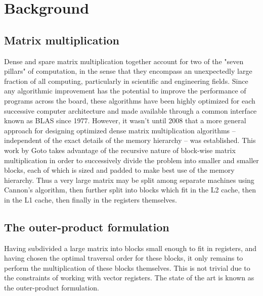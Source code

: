 \chapter{Background}
\label{chapter:review}

\section{Matrix multiplication}
Dense and spare matrix multiplication together account for two of the "seven pillars" of computation, in the sense that they encompass an unexpectedly large fraction of all computing, particularly in scientific and engineering fields. Since any algorithmic improvement has the potential to improve the performance of programs across the board, these algorithms have been highly optimized for each successive computer architecture and made available through a common interface known as BLAS since 1977. However, it wasn't until 2008 that a more general approach for designing optimized dense matrix multiplication algorithms -- independent of the exact details of the memory hierarchy -- was established. This work by Goto takes advantage of the recursive nature of block-wise matrix multiplication in order to successively divide the problem into smaller and smaller blocks, each of which is sized and padded to make best use of the memory hierarchy. Thus a very large matrix may be split among separate machines using Cannon's algorithm, then further split into blocks which fit in the L2 cache, then in the L1 cache, then finally in the registers themselves. 

\section{The outer-product formulation}

Having subdivided a large matrix into blocks small enough to fit in registers, and having chosen the optimal traversal order for these blocks, it only remains to perform the multiplication of these blocks themselves. This is not trivial due to the constraints of working with vector registers. The state of the art is known as the outer-product formulation.

